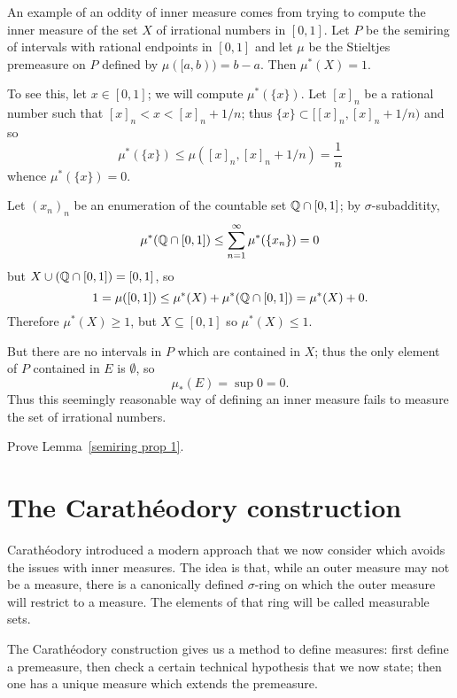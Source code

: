 \begin{example}
An example of an oddity of inner measure comes from trying to compute the inner measure of the set $X$ of irrational numbers in $[0, 1]$.
Let $P$ be the semiring of intervals with rational endpoints in $[0, 1]$ and let $\mu$ be the Stieltjes premeasure on $P$ defined by $\mu([a, b)) = b - a$.
Then $\mu^*(X) = 1$.

To see this, let $x \in [0, 1]$; we will compute $\mu^*(\{x\})$. Let $[x]_{n}$ be a rational number such that $[x]_{n} < x < [x]_{n} + 1/n$; thus $\{x\} \subset [[x]_{n}, [x]_{n} + 1/n)$ and so
\[\mu^*(\{x\}) \leq \mu([x]_{n}, [x]_{n} + 1/n) = \frac{1}{n}\]
whence $\mu^*(\{x\}) = 0$.

Let ${(x_{n})}_{n}$ be an enumeration of the countable set $\mathbb{Q} \cap [0, 1]$; by $\sigma$-subadditity,
\[\mu^*(\mathbb{Q} \cap [0, 1]) \leq \sum_{n=1}^{\infty} \mu^*(\{x_{n}\}) = 0\]
but $X \cup (\mathbb{Q} \cap [0, 1]) = [0, 1]$, so
\[1 = \mu([0, 1]) \leq \mu^*(X) + \mu^*(\mathbb{Q} \cap [0, 1]) = \mu^*(X) + 0.\]
Therefore $\mu^*(X) \geq 1$, but $X \subseteq [0, 1]$ so $\mu^*(X) \leq 1$.

But there are no intervals in $P$ which are contained in $X$; thus the only element of $P$ contained in $E$ is $\emptyset$, so
\[\mu_*(E) = \sup 0 = 0.\]
Thus this seemingly reasonable way of defining an inner measure fails to measure the set of irrational numbers.
\end{example}

\begin{exercise}\label{semiring exercise}
Prove Lemma~\ref{semiring prop 1}.
\end{exercise}


\section{The Carathéodory construction}
Carathéodory introduced a modern approach that we now consider which avoids the issues with inner measures.
The idea is that, while an outer measure may not be a measure, there is a canonically defined $\sigma$-ring on which the outer measure will restrict to a measure.
The elements of that ring will be called measurable sets.

\begin{subsec}
The Carathéodory construction gives us a method to define measures: first define a premeasure, then check a certain technical hypothesis that we now state; then one has a unique measure which extends the premeasure.
\end{subsec}

